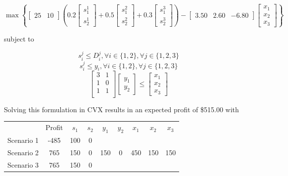 \documentclass[a4paper]{article}
\begin{document}
\begin{equation}
\max \left \{ [\begin{matrix}25 & 10\end{matrix}]
\left( 0.2 \left [\begin{matrix}s_1^1 \\ s_2^1 \end{matrix} \right ] + 0.5 \left [\begin{matrix}s_1^2 \\ s_2^2 \end{matrix} \right ] + 0.3 \left [\begin{matrix}s_1^3 \\ s_2^3 \end{matrix} \right ] \right)
-[\begin{matrix}3.50 & 2.60 & -6.80\end{matrix}] \left [\begin{matrix}x_1 \\ x_2 \\ x_3 \end{matrix} \right ]
\right \}
\end{equation}

subject to

\begin{equation}
s_i^j \leq D_i^j , \forall i \in \{1,2\} , \forall j \in \{1,2,3\}
\end{equation}
\begin{equation}
s_i^j \leq y_i , \forall i \in \{1,2\} , \forall j \in \{1,2,3\}
\end{equation}
\begin{equation}
\left[
\begin{matrix}
3 & 1 \\
1 & 0 \\
1 & 1 \\
\end{matrix}
\right]
\left[\begin{matrix}y_1 \\ y_2\end{matrix}\right]
\leq
\left[\begin{matrix}x_1 \\ x_2 \\ x_3 \end{matrix}\right]
\end{equation}

Solving this formulation in CVX results in an expected profit of \$515.00 with

\begin{tabular}{c  c  c c  c c c c c}
           & Profit & $s_1$ & $s_2$ & $y_1$ & $y_2$ & $x_1$ & $x_2$ & $x_3$ \\
Scenario 1 & -485   & 100   & 0     &       &       &       &       &       \\
Scenario 2 &  765   & 150   & 0     & 150   & 0     & 450   & 150   & 150   \\
Scenario 3 &  765   & 150   & 0     &       &       &       &       &       \\
\end{tabular}
\end{document}
